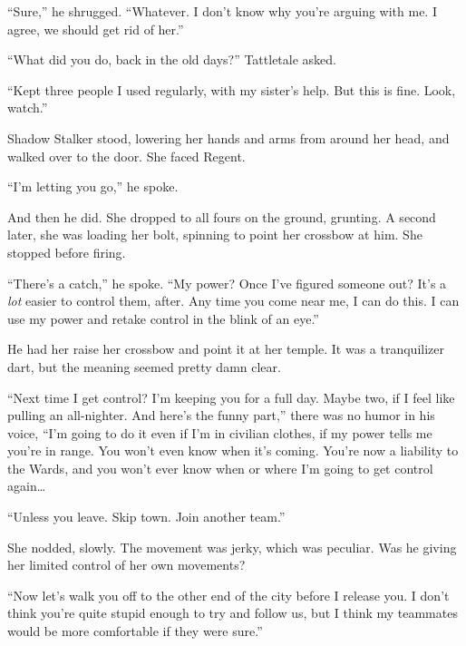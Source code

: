 ``Sure,'' he shrugged.  ``Whatever.  I don't know why you're arguing with me.  I agree, we should get rid of her.''



``What did you do, back in the old days?'' Tattletale asked.



``Kept three people I used regularly, with my sister's help.  But this is fine.  Look, watch.''



Shadow Stalker stood, lowering her hands and arms from around her head, and walked over to the door.  She faced Regent.



``I'm letting you go,'' he spoke.



And then he did.  She dropped to all fours on the ground, grunting.  A second later, she was loading her bolt, spinning to point her crossbow at him.  She stopped before firing.



``There's a catch,'' he spoke. ``My power?  Once I've figured someone out?  It's a \emph{lot} easier to control them, after.  Any time you come near me, I can do this.  I can use my power and retake control in the blink of an eye.''



He had her raise her crossbow and point it at her temple.  It was a tranquilizer dart, but the meaning seemed pretty damn clear.



``Next time I get control?  I'm keeping you for a full day.  Maybe two, if I feel like pulling an all-nighter.  And here's the funny part,'' there was no humor in his voice, ``I'm going to do it even if I'm in civilian clothes, if my power tells me you're in range.  You won't even know when it's coming.  You're now a liability to the Wards, and you won't ever know when or where I'm going to get control again\ldots



``Unless you leave.  Skip town.  Join another team.''



She nodded, slowly.  The movement was jerky, which was peculiar.  Was he giving her limited control of her own movements?



``Now let's walk you off to the other end of the city before I release you.  I don't think you're quite stupid enough to try and follow us, but I think my teammates would be more comfortable if they were sure.''



